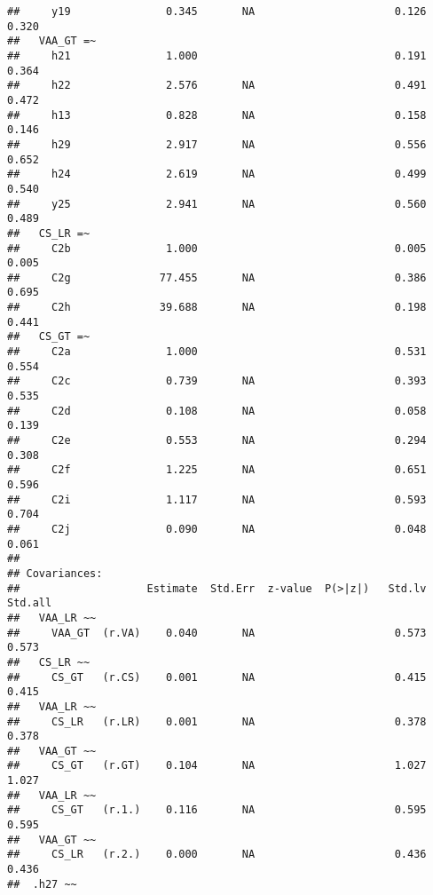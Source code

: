 \documentclass[
]{article}
\begin{document}
\begin{verbatim}
##     y19               0.345       NA                      0.126    0.320
##   VAA_GT =~                                                             
##     h21               1.000                               0.191    0.364
##     h22               2.576       NA                      0.491    0.472
##     h13               0.828       NA                      0.158    0.146
##     h29               2.917       NA                      0.556    0.652
##     h24               2.619       NA                      0.499    0.540
##     y25               2.941       NA                      0.560    0.489
##   CS_LR =~                                                              
##     C2b               1.000                               0.005    0.005
##     C2g              77.455       NA                      0.386    0.695
##     C2h              39.688       NA                      0.198    0.441
##   CS_GT =~                                                              
##     C2a               1.000                               0.531    0.554
##     C2c               0.739       NA                      0.393    0.535
##     C2d               0.108       NA                      0.058    0.139
##     C2e               0.553       NA                      0.294    0.308
##     C2f               1.225       NA                      0.651    0.596
##     C2i               1.117       NA                      0.593    0.704
##     C2j               0.090       NA                      0.048    0.061
## 
## Covariances:
##                    Estimate  Std.Err  z-value  P(>|z|)   Std.lv  Std.all
##   VAA_LR ~~                                                             
##     VAA_GT  (r.VA)    0.040       NA                      0.573    0.573
##   CS_LR ~~                                                              
##     CS_GT   (r.CS)    0.001       NA                      0.415    0.415
##   VAA_LR ~~                                                             
##     CS_LR   (r.LR)    0.001       NA                      0.378    0.378
##   VAA_GT ~~                                                             
##     CS_GT   (r.GT)    0.104       NA                      1.027    1.027
##   VAA_LR ~~                                                             
##     CS_GT   (r.1.)    0.116       NA                      0.595    0.595
##   VAA_GT ~~                                                             
##     CS_LR   (r.2.)    0.000       NA                      0.436    0.436
##  .h27 ~~                                                                

\end{verbatim}
\end{document}
